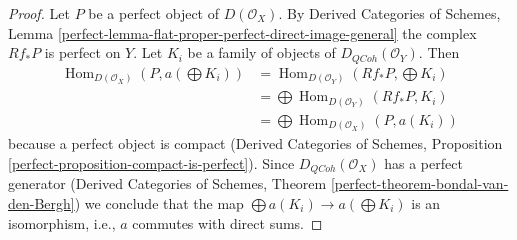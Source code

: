 \documentclass[10pt,a4paper]{amsart}
\theoremstyle{plain}
\theoremstyle{definition}
\theoremstyle{remark}
\numberwithin{equation}{subsection}
\def\Hom{\mathop{\mathrm{Hom}}\nolimits}
\def\QCoh{\mathit{QCoh}}
\begin{document}
\begin{proof}
Let $P$ be a perfect object of $D(\mathcal{O}_X)$. By
Derived Categories of Schemes, Lemma
\ref{perfect-lemma-flat-proper-perfect-direct-image-general}
the complex $Rf_*P$ is perfect on $Y$.
Let $K_i$ be a family of objects of $D_\QCoh(\mathcal{O}_Y)$.
Then
\begin{align*}
\Hom_{D(\mathcal{O}_X)}(P, a(\bigoplus K_i))
& =
\Hom_{D(\mathcal{O}_Y)}(Rf_*P, \bigoplus K_i) \\
& =
\bigoplus \Hom_{D(\mathcal{O}_Y)}(Rf_*P, K_i) \\
& =
\bigoplus \Hom_{D(\mathcal{O}_X)}(P, a(K_i))
\end{align*}
because a perfect object is compact (Derived Categories of Schemes,
Proposition \ref{perfect-proposition-compact-is-perfect}).
Since $D_\QCoh(\mathcal{O}_X)$ has a perfect generator
(Derived Categories of Schemes, Theorem
\ref{perfect-theorem-bondal-van-den-Bergh})
we conclude that the map $\bigoplus a(K_i) \to a(\bigoplus K_i)$
is an isomorphism, i.e., $a$ commutes with direct sums.
\end{proof}
\end{document}
